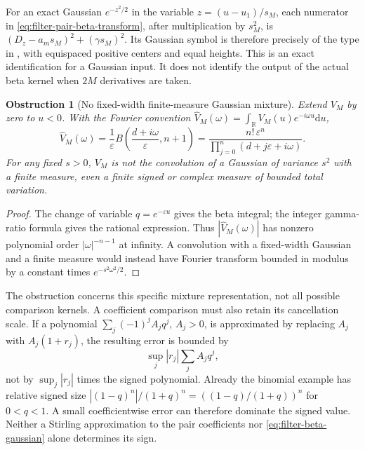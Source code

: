 \documentclass[11pt]{article}
\newtheorem{obstruction}[theorem]{Obstruction}
\theoremstyle{definition}
\theoremstyle{remark}
\newcommand{\R}{\mathbb R}
\newcommand{\dd}{\mathrm d}
\begin{document}
For an exact Gaussian $e^{-z^2/2}$ in the variable $z=(u-u_1)/s_M$,
each numerator in \eqref{eq:filter-pair-beta-transform}, after
multiplication by $s_M^2$, is
$(D_z-a_ms_M)^2+(\gamma s_M)^2$.  Its Gaussian symbol is therefore
precisely of the type in , with
equispaced positive centers and equal heights.  This is an exact
identification for a Gaussian input.  It does not identify the output
of the actual beta kernel when $2M$ derivatives are taken.

\begin{obstruction}[No fixed-width finite-measure Gaussian mixture]
\label{obs:filter-gaussian-mixture}
Extend $V_M$ by zero to $u<0$.  With the Fourier convention
$\widehat V_M(\omega)=\int_\R V_M(u)e^{-i\omega u}\dd u$,
\begin{equation}
 \widehat V_M(\omega)
 =\frac1\varepsilon
   B\!\left(\frac{d+i\omega}{\varepsilon},n+1\right)
 =\frac{n!\,\varepsilon^n}
        {\prod_{j=0}^{n}(d+j\varepsilon+i\omega)}.
 \label{eq:filter-beta-fourier}
\end{equation}
For any fixed $s>0$, $V_M$ is not the convolution of a Gaussian of
variance $s^2$ with a finite measure, even a finite signed or complex
measure of bounded total variation.
\end{obstruction}

\begin{proof}
The change of variable $q=e^{-\varepsilon u}$ gives the beta integral;
the integer gamma-ratio formula gives the rational expression.
Thus $|\widehat V_M(\omega)|$ has nonzero polynomial order
$|\omega|^{-n-1}$ at infinity.  A convolution with a fixed-width
Gaussian and a finite measure would instead have Fourier transform
bounded in modulus by a constant times $e^{-s^2\omega^2/2}$.
\end{proof}

The obstruction concerns this specific mixture representation, not all
possible comparison kernels.  A coefficient comparison must also retain
its cancellation scale.  If a polynomial
$\sum_j(-1)^jA_jq^j$, $A_j>0$, is approximated by replacing $A_j$ with
$A_j(1+r_j)$, the resulting error is bounded by
\begin{equation}
 \sup_j|r_j|\sum_jA_jq^j,
 \label{eq:filter-cancellation-cost}
\end{equation}
not by $\sup_j|r_j|$ times the signed polynomial.  Already the binomial
example has relative signed size
$|(1-q)^n|/(1+q)^n=((1-q)/(1+q))^n$ for $0<q<1$.
A small coefficientwise error can therefore dominate the signed value.
Neither a Stirling approximation to the pair coefficients nor
\eqref{eq:filter-beta-gaussian} alone determines its sign.
\end{document}
